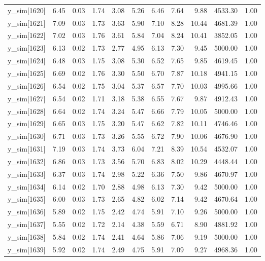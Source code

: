 \begin{table}[ht]
\begin{tabular}{rrrrrrrrrrr}
  y\_sim[1620] & 6.45 & 0.03 & 1.74 & 3.08 & 5.26 & 6.46 & 7.64 & 9.88 & 4533.30 & 1.00 \\ 
  y\_sim[1621] & 7.09 & 0.03 & 1.73 & 3.63 & 5.90 & 7.10 & 8.28 & 10.44 & 4681.39 & 1.00 \\ 
  y\_sim[1622] & 7.02 & 0.03 & 1.76 & 3.61 & 5.84 & 7.04 & 8.24 & 10.41 & 3852.05 & 1.00 \\ 
  y\_sim[1623] & 6.13 & 0.02 & 1.73 & 2.77 & 4.95 & 6.13 & 7.30 & 9.45 & 5000.00 & 1.00 \\ 
  y\_sim[1624] & 6.48 & 0.03 & 1.75 & 3.08 & 5.30 & 6.52 & 7.65 & 9.85 & 4619.45 & 1.00 \\ 
  y\_sim[1625] & 6.69 & 0.02 & 1.76 & 3.30 & 5.50 & 6.70 & 7.87 & 10.18 & 4941.15 & 1.00 \\ 
  y\_sim[1626] & 6.54 & 0.02 & 1.75 & 3.04 & 5.37 & 6.57 & 7.70 & 10.03 & 4995.66 & 1.00 \\ 
  y\_sim[1627] & 6.54 & 0.02 & 1.71 & 3.18 & 5.38 & 6.55 & 7.67 & 9.87 & 4912.43 & 1.00 \\ 
  y\_sim[1628] & 6.64 & 0.02 & 1.74 & 3.24 & 5.47 & 6.66 & 7.79 & 10.05 & 5000.00 & 1.00 \\ 
  y\_sim[1629] & 6.65 & 0.03 & 1.75 & 3.20 & 5.47 & 6.62 & 7.82 & 10.11 & 4746.46 & 1.00 \\ 
  y\_sim[1630] & 6.71 & 0.03 & 1.73 & 3.26 & 5.55 & 6.72 & 7.90 & 10.06 & 4676.90 & 1.00 \\ 
  y\_sim[1631] & 7.19 & 0.03 & 1.74 & 3.73 & 6.04 & 7.21 & 8.39 & 10.54 & 4532.07 & 1.00 \\ 
  y\_sim[1632] & 6.86 & 0.03 & 1.73 & 3.56 & 5.70 & 6.83 & 8.02 & 10.29 & 4448.44 & 1.00 \\ 
  y\_sim[1633] & 6.37 & 0.03 & 1.74 & 2.98 & 5.22 & 6.36 & 7.50 & 9.86 & 4670.97 & 1.00 \\ 
  y\_sim[1634] & 6.14 & 0.02 & 1.70 & 2.88 & 4.98 & 6.13 & 7.30 & 9.42 & 5000.00 & 1.00 \\ 
  y\_sim[1635] & 6.00 & 0.03 & 1.73 & 2.65 & 4.82 & 6.02 & 7.14 & 9.42 & 4670.64 & 1.00 \\ 
  y\_sim[1636] & 5.89 & 0.02 & 1.75 & 2.42 & 4.74 & 5.91 & 7.10 & 9.26 & 5000.00 & 1.00 \\ 
  y\_sim[1637] & 5.55 & 0.02 & 1.72 & 2.14 & 4.38 & 5.59 & 6.71 & 8.90 & 4881.92 & 1.00 \\ 
  y\_sim[1638] & 5.84 & 0.02 & 1.74 & 2.41 & 4.64 & 5.86 & 7.06 & 9.19 & 5000.00 & 1.00 \\ 
  y\_sim[1639] & 5.92 & 0.02 & 1.74 & 2.49 & 4.75 & 5.91 & 7.09 & 9.27 & 4968.36 & 1.00 \\ 

\end{tabular}
\end{table}
